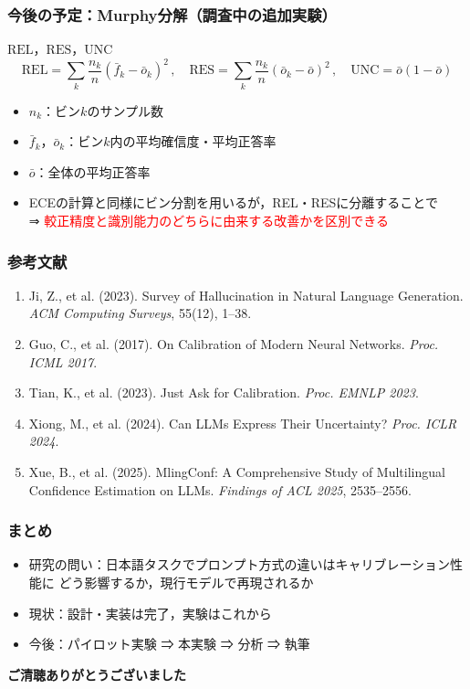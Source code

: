 \documentclass[dvipdfmx]{beamer}
\begin{document}
\begin{frame}
\frametitle{今後の予定：Murphy分解（調査中の追加実験）}
\begin{block}{$\mathrm{REL}$，$\mathrm{RES}$，$\mathrm{UNC}$}
\[
\mathrm{REL} = \sum_k \frac{n_k}{n}(\bar{f}_k - \bar{o}_k)^2 \, , \quad
\mathrm{RES} = \sum_k \frac{n_k}{n}(\bar{o}_k - \bar{o})^2 \, , \quad
\mathrm{UNC} = \bar{o}(1-\bar{o})
\]
\end{block}
\begin{itemize}
	\item $n_k$：ビン$k$のサンプル数
	\item $\bar{f}_k$，$\bar{o}_k$：ビン$k$内の平均確信度・平均正答率
	\item $\bar{o}$：全体の平均正答率
	\vspace{10pt}
	\item ECEの計算と同様にビン分割を用いるが，REL・RESに分離することで
	\\⇒ \textcolor{red}{較正精度と識別能力のどちらに由来する改善かを区別できる}
\end{itemize}
\end{frame}

\begin{frame}
\frametitle{参考文献}
\footnotesize
\begin{enumerate}
	\item Ji, Z., et al. (2023). Survey of Hallucination in Natural Language Generation. \textit{ACM Computing Surveys}, 55(12), 1--38.
	\item Guo, C., et al. (2017). On Calibration of Modern Neural Networks. \textit{Proc. ICML 2017}.
	\item Tian, K., et al. (2023). Just Ask for Calibration. \textit{Proc. EMNLP 2023}.
	\item Xiong, M., et al. (2024). Can LLMs Express Their Uncertainty? \textit{Proc. ICLR 2024}.
	\item Xue, B., et al. (2025). MlingConf: A Comprehensive Study of Multilingual Confidence Estimation on LLMs. \textit{Findings of ACL 2025}, 2535--2556.
\end{enumerate}
\end{frame}

\begin{frame}
\frametitle{まとめ}
\begin{itemize}
	\item 研究の問い：日本語タスクでプロンプト方式の違いはキャリブレーション性能に
	      どう影響するか，現行モデルで再現されるか
	\vspace{10pt}
	\item 現状：設計・実装は完了，実験はこれから
	\vspace{10pt}
	\item 今後：パイロット実験 ⇒ 本実験 ⇒ 分析 ⇒ 執筆
\end{itemize}
\vspace{10pt}
\begin{center}
\large\textbf{ご清聴ありがとうございました}
\end{center}
\end{frame}
\end{document}
